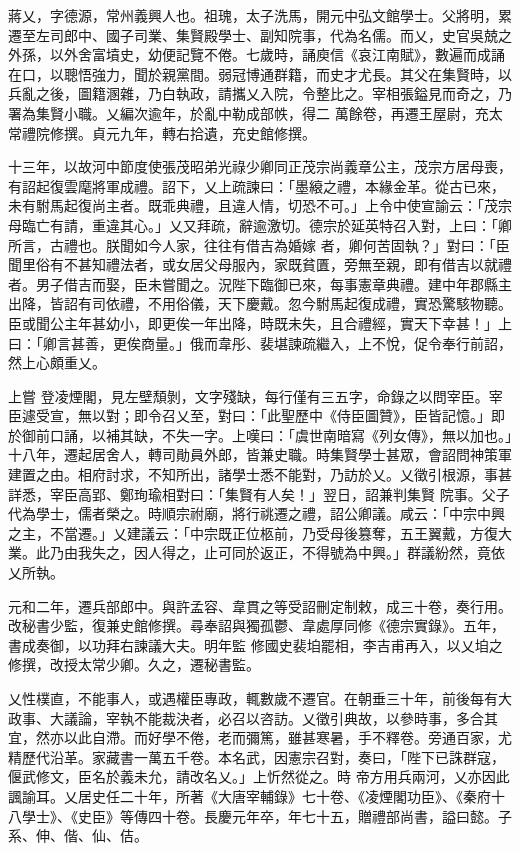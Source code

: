 \begin{pinyinscope}
 蔣乂，字德源，常州義興人也。祖瑰，太子洗馬，開元中弘文館學士。父將明，累遷至左司郎中、國子司業、集賢殿學士、副知院事，代為名儒。而乂，史官吳兢之外孫，以外舍富墳史，幼便記覽不倦。七歲時，誦庾信《哀江南賦》，數遍而成誦在口，以聰悟強力，聞於親黨間。弱冠博通群籍，而史才尤長。其父在集賢時，以兵亂之後，圖籍溷雜，乃白執政，請攜乂入院，令整比之。宰相張鎰見而奇之，乃署為集賢小職。乂編次逾年，於亂中勒成部帙，得二
 萬餘卷，再遷王屋尉，充太常禮院修撰。貞元九年，轉右拾遺，充史館修撰。



 十三年，以故河中節度使張茂昭弟光祿少卿同正茂宗尚義章公主，茂宗方居母喪，有詔起復雲麾將軍成禮。詔下，乂上疏諫曰：「墨縗之禮，本緣金革。從古已來，未有駙馬起復尚主者。既乖典禮，且違人情，切恐不可。」上令中使宣諭云：「茂宗母臨亡有請，重違其心。」乂又拜疏，辭逾激切。德宗於延英特召入對，上曰：「卿所言，古禮也。朕聞如今人家，往往有借吉為婚嫁
 者，卿何苦固執？」對曰：「臣聞里俗有不甚知禮法者，或女居父母服內，家既貧匱，旁無至親，即有借吉以就禮者。男子借吉而娶，臣未嘗聞之。況陛下臨御已來，每事憲章典禮。建中年郡縣主出降，皆詔有司依禮，不用俗儀，天下慶戴。忽今駙馬起復成禮，實恐驚駭物聽。臣或聞公主年甚幼小，即更俟一年出降，時既未失，且合禮經，實天下幸甚！」上曰：「卿言甚善，更俟商量。」俄而韋彤、裴堪諫疏繼入，上不悅，促令奉行前詔，然上心頗重乂。



 上嘗
 登凌煙閣，見左壁頹剝，文字殘缺，每行僅有三五字，命錄之以問宰臣。宰臣遽受宣，無以對；即令召乂至，對曰：「此聖歷中《侍臣圖贊》，臣皆記憶。」即於御前口誦，以補其缺，不失一字。上嘆曰：「虞世南暗寫《列女傳》，無以加也。」十八年，遷起居舍人，轉司勛員外郎，皆兼史職。時集賢學士甚眾，會詔問神策軍建置之由。相府討求，不知所出，諸學士悉不能對，乃訪於乂。乂徵引根源，事甚詳悉，宰臣高郢、鄭珣瑜相對曰：「集賢有人矣！」翌日，詔兼判集賢
 院事。父子代為學士，儒者榮之。時順宗祔廟，將行祧遷之禮，詔公卿議。咸云：「中宗中興之主，不當遷。」乂建議云：「中宗既正位柩前，乃受母後篡奪，五王翼戴，方復大業。此乃由我失之，因人得之，止可同於返正，不得號為中興。」群議紛然，竟依乂所執。



 元和二年，遷兵部郎中。與許孟容、韋貫之等受詔刪定制敕，成三十卷，奏行用。改秘書少監，復兼史館修撰。尋奉詔與獨孤鬱、韋處厚同修《德宗實錄》。五年，書成奏御，以功拜右諫議大夫。明年監
 修國史裴垍罷相，李吉甫再入，以乂垍之修撰，改授太常少卿。久之，遷秘書監。



 乂性樸直，不能事人，或遇權臣專政，輒數歲不遷官。在朝垂三十年，前後每有大政事、大議論，宰執不能裁決者，必召以咨訪。乂徵引典故，以參時事，多合其宜，然亦以此自滯。而好學不倦，老而彌篤，雖甚寒暑，手不釋卷。旁通百家，尤精歷代沿革。家藏書一萬五千卷。本名武，因憲宗召對，奏曰，「陛下已誅群寇，偃武修文，臣名於義未允，請改名乂。」上忻然從之。時
 帝方用兵兩河，乂亦因此諷諭耳。乂居史任二十年，所著《大唐宰輔錄》七十卷、《凌煙閣功臣》、《秦府十八學士》、《史臣》等傳四十卷。長慶元年卒，年七十五，贈禮部尚書，謚曰懿。子系、伸、偕、仙、佶。




\end{pinyinscope}
